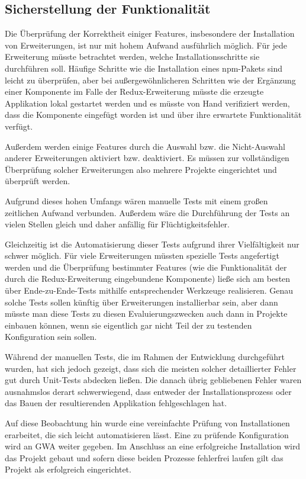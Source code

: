 \subsection{Sicherstellung der Funktionalität}
Die Überprüfung der Korrektheit einiger Features, insbesondere der Installation von Erweiterungen, ist nur mit hohem Aufwand ausführlich möglich. Für jede Erweiterung müsste betrachtet werden, welche Installationsschritte sie durchführen soll. Häufige Schritte wie die Installation eines \gls{npm}-Pakets sind leicht zu überprüfen, aber bei außergewöhnlicheren Schritten wie der Ergänzung einer Komponente im Falle der Redux-Erweiterung müsste die erzeugte Applikation lokal gestartet werden und es müsste von Hand verifiziert werden, dass die Komponente eingefügt worden ist und über ihre erwartete Funktionalität verfügt.

Außerdem werden einige Features durch die Auswahl bzw. die Nicht-Auswahl anderer Erweiterungen aktiviert bzw. deaktiviert. Es müssen zur vollständigen Überprüfung solcher Erweiterungen also mehrere Projekte eingerichtet und überprüft werden.

Aufgrund dieses hohen Umfangs wären manuelle Tests mit einem großen zeitlichen Aufwand verbunden. Außerdem wäre die Durchführung der Tests an vielen Stellen gleich und daher anfällig für Flüchtigkeitsfehler.

Gleichzeitig ist die Automatisierung dieser Tests aufgrund ihrer Vielfältigkeit nur schwer möglich. Für viele Erweiterungen müssten spezielle Tests angefertigt werden und die Überprüfung bestimmter Features (wie die Funktionalität der durch die Redux-Erweiterung eingebundene Komponente) ließe sich am besten über Ende-zu-Ende-Tests mithilfe entsprechender Werkzeuge realisieren. Genau solche Tests sollen künftig über Erweiterungen installierbar sein, aber dann müsste man diese Tests zu diesen Evaluierungszwecken auch dann in Projekte einbauen können, wenn sie eigentlich gar nicht Teil der zu testenden Konfiguration sein sollen.

Während der manuellen Tests, die im Rahmen der Entwicklung durchgeführt wurden, hat sich jedoch gezeigt, dass sich die meisten solcher detaillierter Fehler gut durch Unit-Tests abdecken ließen. Die danach übrig gebliebenen Fehler waren ausnahmslos derart schwerwiegend, dass entweder der Installationsprozess oder das Bauen der resultierenden Applikation fehlgeschlagen hat.

Auf diese Beobachtung hin wurde eine vereinfachte Prüfung von Installationen erarbeitet, die sich leicht automatisieren lässt. Eine zu prüfende Konfiguration wird an \gls{GWA} weiter gegeben. Im Anschluss an eine erfolgreiche Installation wird das Projekt gebaut und sofern diese beiden Prozesse fehlerfrei laufen gilt das Projekt als erfolgreich eingerichtet.

